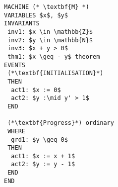 \documentclass[a4paper,11pt]{article}
\begin{document}
\begin{lstlisting}[language=eventb]
MACHINE (* \textbf{M} *)
VARIABLES $x$, $y$
INVARIANTS
 inv1: $x \in \mathbb{Z}$
 inv2: $y \in \mathbb{N}$
 inv3: $x + y > 0$
 thm1: $x \geq - y$ theorem
EVENTS
 (*\textbf{INITIALISATION}*)
 THEN
  act1: $x := 0$
  act2: $y :\mid y' > 1$
 END

 (*\textbf{Progress}*) ordinary
 WHERE
  grd1: $y \geq 0$
 THEN
  act1: $x := x + 1$
  act2: $y := y - 1$
 END
END
\end{lstlisting}
\end{document}
